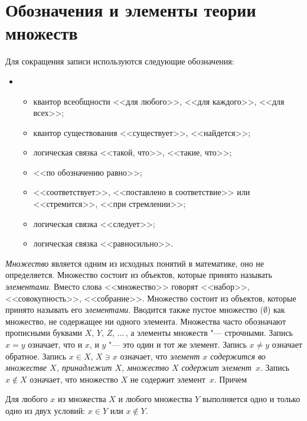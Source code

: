 \chapter{Обозначения и элементы теории множеств}

Для сокращения записи используются следующие обозначения:
\begin{itemize}
\item[]
\begin{itemize}[noitemsep, label = ---]
\item \makebox[0pt][r]{$\forall$\hspace{0.75cm}}
квантор всеобщности <<для любого>>, <<для каждого>>, <<для всех>>;
\item \makebox[0pt][r]{$\exists$\hspace{0.75cm}}
квантор существования  <<существует>>, <<найдется>>;
\item \makebox[0pt][r]{$:$\hspace{0.75cm}}
логическая связка <<такой, что>>, <<такие, что>>;
\item \makebox[0pt][r]{$\triangleq$\hspace{0.75cm}} 
<<по обозначению равно>>;
\item \makebox[0pt][r]{$\to$\hspace{0.75cm}}
<<соответствует>>, <<поставлено в соответствие>> или <<стремится>>, <<при стремлении>>;
\item \makebox[0pt][r]{$\Rightarrow$\hspace{0.75cm}}
логическая связка <<следует>>;
\item \makebox[0pt][r]{$\Leftrightarrow$\hspace{0.75cm}}
логическая связка <<равносильно>>.
\end{itemize}
\end{itemize}

\textit{Множество} является одним из исходных понятий в математике, оно не определяется. Множество состоит из объектов, которые принято называть \textit{элементами}. Вместо слова <<множество>> говорят <<набор>>, <<совокупность>>, <<собрание>>. Множество состоит из объектов, которые принято называть его \textit{элементами}. Вводится также пустое множество ($\emptyset$) как множество, не содержащее ни одного элемента. Множества часто обозначают прописными буквами $X$, $Y$, $Z$, $\dots\,$, а элементы множеств "--- строчными.  Запись $x = y$ означает, что и $x$, и $y$ "--- это один и тот же элемент. Запись $x\neq y$ означает обратное. Запись $x\in X$, $X\ni x$ означает, что \textit{элемент $x$ содержится во множестве $X$, принадлежит $X$, множество $X$ содержит элемент~$x$}. Запись $x \notin X$ означает, что множество $X$ не содержит элемент~$x$. Причем
\begin{axiome}
Для любого $x$ из множества $X$ и любого множества $Y$ выполняется одно и только одно из двух условий: $x\in Y$ или $x\notin Y$.
\end{axiome}

